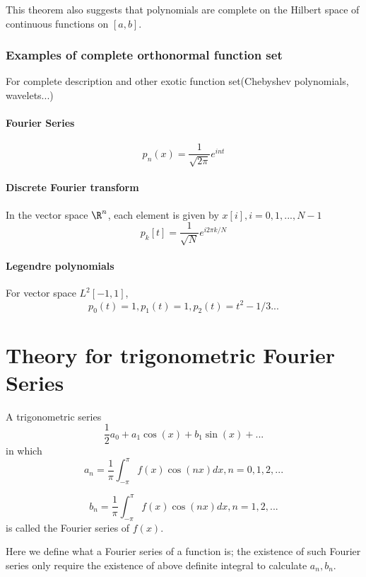 \begin{refsection}
\begin{remark}
	This theorem also suggests that polynomials are complete on the Hilbert space of continuous functions on $[a,b]$.
\end{remark}

\subsubsection{Examples of complete orthonormal function set}
For complete description and other exotic function set(Chebyshev polynomials, wavelets...)\cite[187]{moon2000mathematical}\cite[112]{debnath2005hilbert}
\paragraph{Fourier Series}
$$p_n(x)=\frac{1}{\sqrt{2\pi}}e^{i n t}$$
\paragraph{Discrete Fourier transform}
In the vector space $\R^n$, each element is given by $x[i],i=0,1,...,N-1$
$$p_k[t]=\frac{1}{\sqrt{N}}e^{i 2\pi k/N}$$

\paragraph{Legendre polynomials}
For vector space $L^2[-1,1]$, 
$$p_0(t)=1,p_1(t)=1,p_2(t)=t^2-1/3...$$





\section{Theory for trigonometric Fourier Series}
\begin{definition}
	A trigonometric series 
	$$\frac{1}{2}a_0 + a_1 \cos(x) + b_1 \sin(x) + ...$$
	in which 
	$$a_n = \frac{1}{\pi}\int_{-\pi}^\pi f(x)\cos(nx) dx,n=0,1,2,...$$
	
	$$b_n = \frac{1}{\pi}\int_{-\pi}^\pi f(x)\cos(nx) dx,n=1,2,...$$
	is called the Fourier series of $f(x)$.
\end{definition}

\begin{remark}
	Here we define what a Fourier series of a function is; the existence of such Fourier series only require the existence of above definite integral to calculate $a_n,b_n$.
\end{remark}


\end{refsection}
